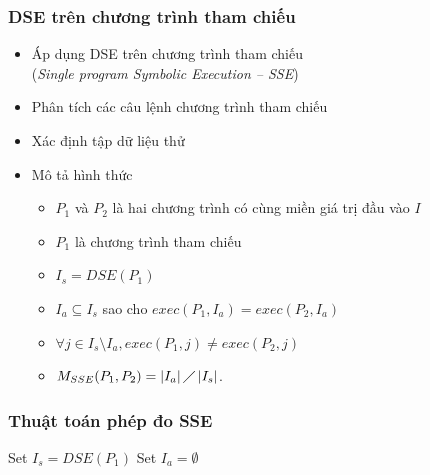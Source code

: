 \documentclass{beamer}
\begin{document}
\begin{frame}
  \frametitle{DSE trên chương trình tham chiếu}
  \begin{itemize}
  	\item Áp dụng DSE trên chương trình tham chiếu
  	\\ (\emph{Single program Symbolic Execution -- SSE})
  	\item Phân tích các câu lệnh chương trình tham chiếu
  	\item Xác định tập dữ liệu thử
  	\item Mô tả hình thức
  	\begin{itemize}
	\item $P_{1}$ và $P_{2}$ là hai chương trình có cùng miền giá trị đầu
	vào $I$
	\item $P_{1}$ là chương trình tham chiếu
	\item $I_{s} = DSE(P_{1})$
	\item $I_{a} \subseteq I_s$ sao cho
	$exec(P_{1}, I_a) = exec(P_{2}, I_a)$
	\item $\forall j \in I_{s} \setminus I_{a}, exec(P_{1}, j) \neq
	exec(P_{2}, j)$
	\item $M_{SSE}(P_{1}, P_{2}) = \left|I_{a}\right| \diagup
	\left|I_{s}\right| $.
  	\end{itemize}
  \end{itemize}
\end{frame}


\begin{frame}
  \frametitle{Thuật toán phép đo SSE}
  \begin{algorithm}[H]
  	Set $I_{s} = DSE(P_{1})$ \;
  	Set $I_{a} = \emptyset$ \;
  	{  			
  	}
  \end{algorithm}
\end{frame}
\end{document}
